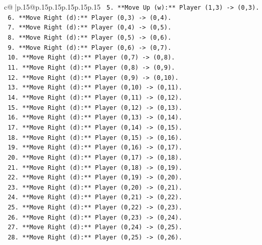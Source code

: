 \documentclass{article}
\begin{document}
{\begin{supertabular}{c@{$\;$}|p{.15\linewidth}@{}p{.15\linewidth}p{.15\linewidth}p{.15\linewidth}p{.15\linewidth}p{.15\linewidth}}
{{{\texttt{        5.  **Move Up (w):** Player (1,3) {-}> (0,3).} \\
\texttt{        6.  **Move Right (d):** Player (0,3) {-}> (0,4).} \\
\texttt{        7.  **Move Right (d):** Player (0,4) {-}> (0,5).} \\
\texttt{        8.  **Move Right (d):** Player (0,5) {-}> (0,6).} \\
\texttt{        9.  **Move Right (d):** Player (0,6) {-}> (0,7).} \\
\texttt{        10. **Move Right (d):** Player (0,7) {-}> (0,8).} \\
\texttt{        11. **Move Right (d):** Player (0,8) {-}> (0,9).} \\
\texttt{        12. **Move Right (d):** Player (0,9) {-}> (0,10).} \\
\texttt{        13. **Move Right (d):** Player (0,10) {-}> (0,11).} \\
\texttt{        14. **Move Right (d):** Player (0,11) {-}> (0,12).} \\
\texttt{        15. **Move Right (d):** Player (0,12) {-}> (0,13).} \\
\texttt{        16. **Move Right (d):** Player (0,13) {-}> (0,14).} \\
\texttt{        17. **Move Right (d):** Player (0,14) {-}> (0,15).} \\
\texttt{        18. **Move Right (d):** Player (0,15) {-}> (0,16).} \\
\texttt{        19. **Move Right (d):** Player (0,16) {-}> (0,17).} \\
\texttt{        20. **Move Right (d):** Player (0,17) {-}> (0,18).} \\
\texttt{        21. **Move Right (d):** Player (0,18) {-}> (0,19).} \\
\texttt{        22. **Move Right (d):** Player (0,19) {-}> (0,20).} \\
\texttt{        23. **Move Right (d):** Player (0,20) {-}> (0,21).} \\
\texttt{        24. **Move Right (d):** Player (0,21) {-}> (0,22).} \\
\texttt{        25. **Move Right (d):** Player (0,22) {-}> (0,23).} \\
\texttt{        26. **Move Right (d):** Player (0,23) {-}> (0,24).} \\
\texttt{        27. **Move Right (d):** Player (0,24) {-}> (0,25).} \\
\texttt{        28. **Move Right (d):** Player (0,25) {-}> (0,26).} \\
}}}
\end{supertabular}}
\end{document}
